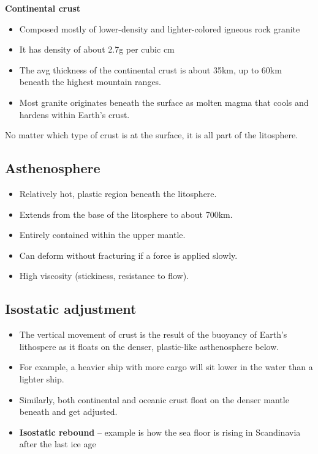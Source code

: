 \textbf{Continental crust}
\begin{itemize}
	\item Composed mostly of lower-density and lighter-colored igneous
		rock granite
	\item It has density of about 2.7g per cubic cm
	\item The avg thickness of the continental crust is about 35km, up to
		60km beneath the highest mountain ranges.
	\item Most granite originates beneath the surface as molten magma that
		cools and hardens within Earth's crust.
\end{itemize}

No matter which type of crust is at the surface, it is all part of the
litosphere.

\subsection{Asthenosphere}

\begin{itemize}
	\item Relatively hot, plastic region beneath the litosphere.
	\item Extends from the base of the litosphere to about 700km.
	\item Entirely contained within the upper mantle.
	\item Can deform without fracturing if a force is applied slowly.
	\item High viscosity (stickiness, resistance to flow).
\end{itemize}

\subsection{Isostatic adjustment}

\begin{itemize}
	\item The vertical movement of crust is the result of the buoyancy of
		Earth's lithospere as it floats on the denser, plastic-like
		asthenosphere below.
	\item For example, a heavier ship  with more cargo will sit lower in
		the water than a lighter ship.
	\item Similarly, both continental and oceanic crust float on the denser
		mantle beneath and get adjusted.
	\item \textbf{Isostatic rebound} -- example is how the sea floor is 
		rising in Scandinavia after the last ice age
\end{itemize}

